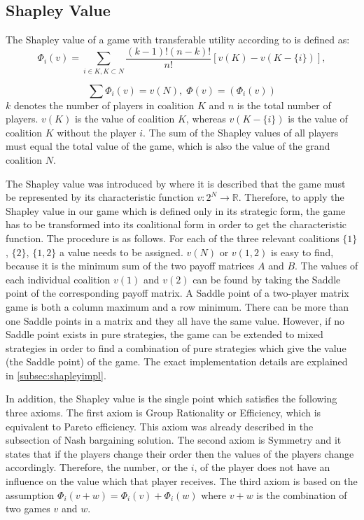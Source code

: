 {\subsection{Shapley Value}
\label{subsec:shapleyfund}
The Shapley value of a game with transferable utility according to \citet{holler2006einfuhrung} is defined as:
\begin{equation}
\label{eq:shapley}
\Phi_i(v) = \sum_{i \in K, K \subset N} \frac{(k-1)!(n-k)!}{n!} [ v(K) - v(K - \{i\})],
\end{equation}

\begin{equation}
\sum \Phi_i(v) = v(N), \; \Phi(v) = (\Phi_i(v))
\end{equation}
$k$ denotes the number of players in coalition $K$ and $n$ is the total number of players. $v(K)$ is the value of coalition $K$, whereas $v(K - \{i\})$ is the value of coalition $K$ without the player $i$. The sum of the Shapley values of all players must equal the total value of the game, which is also the value of the grand coalition $N$.

The Shapley value was introduced by \citet{shapley1952value} where it is described that the game must be represented by its characteristic function $v: 2^N	\rightarrow \mathbb{R}$. Therefore, to apply the Shapley value in our game which is defined only in its strategic form, the game has to be transformed into its coalitional form in order to get the characteristic function. The procedure is as follows. For each of the three relevant coalitions $\{1\}$, $\{2\}$, $\{1,2\}$ a value needs to be assigned. $v(N)$ or $v(1,2)$ is easy to find, because it is the minimum sum of the two payoff matrices $A$ and $B$. The values of each individual coalition $v(1)$ and $v(2)$ can be found by taking the Saddle point of the corresponding payoff matrix. A Saddle point of a two-player matrix game is both a column maximum and a row minimum. There can be more than one Saddle points in a matrix and they all have the same value. However, if no Saddle point exists in pure strategies, the game can be extended to mixed strategies in order to find a combination of pure strategies which give the value (the Saddle point) of the game. The exact implementation details are explained in \ref{subsec:shapleyimpl}.

In addition, the Shapley value is the single point which satisfies the following three axioms. The first axiom is Group Rationality or Efficiency, which is equivalent to Pareto efficiency. This axiom was already described in the subsection of Nash bargaining solution. The second axiom is Symmetry and it states that if the players change their order then the values of the players change accordingly. Therefore, the number, or the $i$, of the player does not have an influence on the value which that player receives. The third axiom is based on the assumption $\Phi_i(v+w) = \Phi_i(v) + \Phi_i(w)$ where $v+w$ is the combination of two games $v$ and $w$.

}
